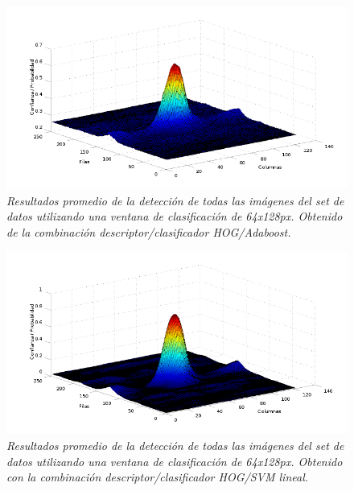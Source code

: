 \begin{figure}[htc]
  \centering
  \includegraphics[scale=.6]{images/mean/boost/64}
  \caption{\em  Resultados promedio de la detección de todas las imágenes del set de datos utilizando una ventana de clasificación de 64x128px. Obtenido de la combinación descriptor/clasificador HOG/Adaboost.}  
  \label{fig:gp3}
\end{figure}

\begin{figure}[htc]
  \centering
  \includegraphics[scale=.6]{images/mean/svm/64}
  \caption{\em  Resultados promedio de la detección de todas las imágenes del set de datos utilizando una ventana de clasificación de 64x128px. Obtenido con la combinación descriptor/clasificador HOG/SVM lineal.}  
  \label{fig:gp4}
\end{figure}

